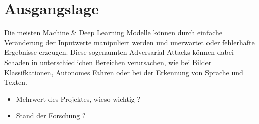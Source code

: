 \section{Ausgangslage}
Die meisten Machine \& Deep Learning Modelle können durch einfache Veränderung der Inputwerte manipuliert werden und unerwartet oder fehlerhafte Ergebnisse erzeugen. Diese sogenannten Adversarial Attacks können dabei Schaden in unterschiedlichen Bereichen verursachen, wie bei Bilder Klassifkationen, Autonomes Fahren oder bei der Erkennung von Sprache und Texten. 

\begin{itemize}
    \item Mehrwert des Projektes, wieso wichtig ?
    \item Stand der Forschung ?
\end{itemize}